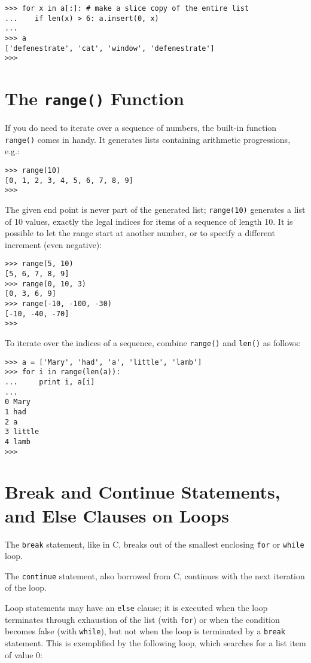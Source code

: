 \bcode\begin{verbatim}
>>> for x in a[:]: # make a slice copy of the entire list
...    if len(x) > 6: a.insert(0, x)
... 
>>> a
['defenestrate', 'cat', 'window', 'defenestrate']
>>> 
\end{verbatim}\ecode

\section{The {\tt range()} Function}

If you do need to iterate over a sequence of numbers, the built-in
function {\tt range()} comes in handy.  It generates lists containing
arithmetic progressions, e.g.:

\bcode\begin{verbatim}
>>> range(10)
[0, 1, 2, 3, 4, 5, 6, 7, 8, 9]
>>> 
\end{verbatim}\ecode
%
The given end point is never part of the generated list; {\tt range(10)}
generates a list of 10 values, exactly the legal indices for items of a
sequence of length 10.  It is possible to let the range start at another
number, or to specify a different increment (even negative):

\bcode\begin{verbatim}
>>> range(5, 10)
[5, 6, 7, 8, 9]
>>> range(0, 10, 3)
[0, 3, 6, 9]
>>> range(-10, -100, -30)
[-10, -40, -70]
>>> 
\end{verbatim}\ecode
%
To iterate over the indices of a sequence, combine {\tt range()} and
{\tt len()} as follows:

\bcode\begin{verbatim}
>>> a = ['Mary', 'had', 'a', 'little', 'lamb']
>>> for i in range(len(a)):
...     print i, a[i]
... 
0 Mary
1 had
2 a
3 little
4 lamb
>>> 
\end{verbatim}\ecode

\section{Break and Continue Statements, and Else Clauses on Loops}

The {\tt break} statement, like in C, breaks out of the smallest
enclosing {\tt for} or {\tt while} loop.

The {\tt continue} statement, also borrowed from C, continues with the
next iteration of the loop.

Loop statements may have an {\tt else} clause; it is executed when the
loop terminates through exhaustion of the list (with {\tt for}) or when
the condition becomes false (with {\tt while}), but not when the loop is
terminated by a {\tt break} statement.  This is exemplified by the
following loop, which searches for a list item of value 0:

